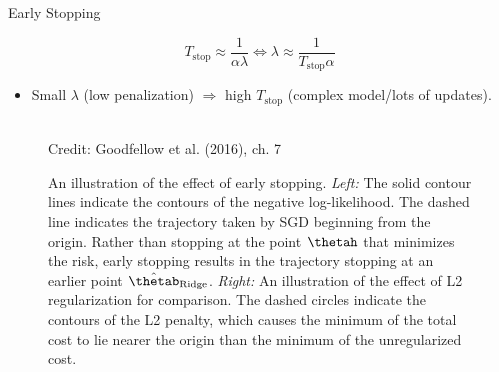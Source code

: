 \begin{vbframe}{Early Stopping}
\begin{itemize}
  \end{itemize}
    \begin{equation*}
      T_{\text{stop}} \approx \frac{1}{\alpha \lambda} 
        \Leftrightarrow \lambda \approx \frac{1}{T_{\text{stop}} \alpha}
    \end{equation*}
  \begin{itemize}
    \item Small $\lambda$ (low penalization) $\Rightarrow$ high $T_{\text{stop}}$ (complex model/lots of updates).
  \end{itemize}
\framebreak
  \begin{figure}
    \centering
      \tiny{\\ Credit: Goodfellow et al. (2016), ch. 7}
      \caption{\footnotesize An illustration of the effect of early stopping. \textit{Left:} The solid contour lines indicate the contours of the negative log-likelihood. The dashed line indicates the trajectory taken by SGD beginning from the origin. Rather than stopping at the point $\thetah$ that minimizes the risk, early stopping results in the trajectory stopping at an earlier point $\hat{\thetab}_{\text{Ridge}}$. \textit{Right:} An illustration of the effect of L2 regularization for comparison. The dashed circles indicate the contours of the L2 penalty, which causes the minimum of the total cost to lie nearer the origin than the minimum of the unregularized cost.}
  \end{figure}
\end{vbframe}

